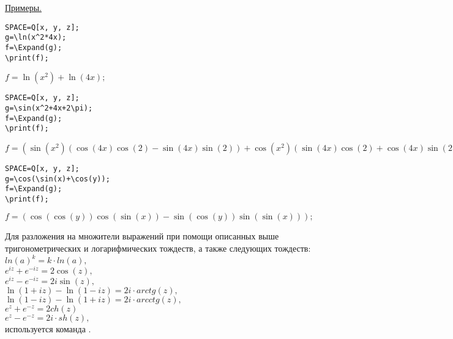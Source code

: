 \smallskip
\underline{Примеры. }
\begin{verbatim}
SPACE=Q[x, y, z]; 
g=\ln(x^2*4x); 
f=\Expand(g); 
\print(f);
\end{verbatim}\vspace*{-3mm}

{\hspace*{4mm} $f=\ln(x^2) + \ln(4x);$} 

\begin{verbatim}
SPACE=Q[x, y, z]; 
g=\sin(x^2+4x+2\pi); 
f=\Expand(g); 
\print(f);
\end{verbatim}\vspace*{-3mm}

{\hspace*{4mm} $f=(\sin(x^2)(\cos(4x)\cos(2)-\sin(4x)\sin(2))+\cos(x^2)(\sin(4x)\cos(2)+\cos(4x)\sin(2)));$} 

\begin{verbatim}
SPACE=Q[x, y, z]; 
g=\cos(\sin(x)+\cos(y)); 
f=\Expand(g); 
\print(f);
\end{verbatim}\vspace*{-3mm}

{\hspace*{4mm} $f=(\cos(\cos(y))\cos(\sin(x))-\sin(\cos(y))\sin(\sin(x)));$}

Для разложения на множители выражений при помощи описанных выше тригонометрических и логарифмических тождеств, а также следующих тождеств:\\
$ln(a)^k = k\cdot ln(a),$\\
$e^{iz} + e^{-iz} = 2\cos(z),$\\
$e^{iz} - e^{-iz} = 2i\sin(z),$\\
$\ln(1+iz) - \ln(1-iz) = 2i\cdot arctg(z),$\\
$\ln(1-iz) - \ln(1+iz) = 2i\cdot arcctg(z),$\\
$e^{z} + e^{-z} = 2ch(z)$\\
$e^{z} - e^{-z} = 2i\cdot sh(z),$\\
используется команда .

